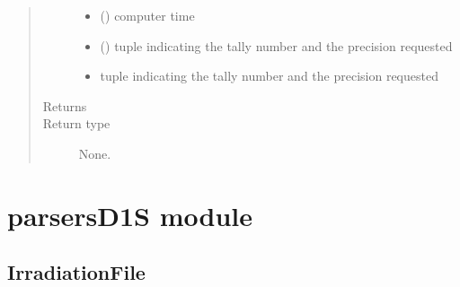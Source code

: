 \documentclass[letterpaper,10pt,english]{sphinxmanual}
\begin{document}
\begin{fulllineitems}
\begin{fulllineitems}
\begin{quote}
\begin{description}
\begin{itemize}
\item {} 
 () \textendash{} computer time

\item {} 
\sphinxstyleliteralstrong{\sphinxupquote{=}}\sphinxstyleliteralstrong{\sphinxupquote{ (}} () \textendash{} tuple indicating the tally number and the precision requested

\item {} 
\sphinxstyleliteralstrong{\sphinxupquote{)}} \textendash{} tuple indicating the tally number and the precision requested

\end{itemize}

\item[{Returns}] \leavevmode


\item[{Return type}] \leavevmode
None.

\end{description}\end{quote}

\end{fulllineitems}


\end{fulllineitems}



\section{parsersD1S module}
\label{\detokenize{api/inputgeneration:parsersd1s-module}}

\subsection{IrradiationFile}
\label{\detokenize{api/inputgeneration:irradiationfile}}\label{\detokenize{api/inputgeneration:irradfileob}}
\end{document}

